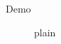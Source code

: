 \documentclass{beamer}
\begin{document}
\begin{frame}{Demo}
\begin{figure}
\frame{\rule{2cm}{1cm}}
\caption{plain}
\end{figure}
\end{frame}
\end{document}
